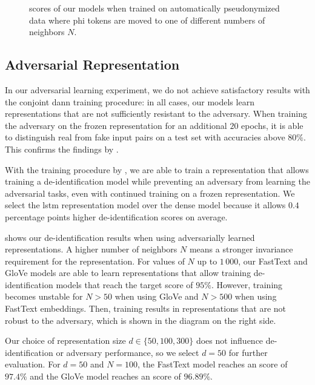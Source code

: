 \begin{figure}
    \centering
    
    \caption[De-identification with automatic pseudonymization]{\fone scores of our models when trained on automatically pseudonymized data where \ac{phi} tokens are moved to one of different numbers of neighbors $N$.}\label{fig:auto-pseudo}
\end{figure}

\subsection{Adversarial Representation}
%
In our adversarial learning experiment, we do not achieve satisfactory results with the conjoint \ac{dann} training procedure: in all cases, our models learn representations that are not sufficiently resistant to the adversary.
%
When training the adversary on the frozen representation for an additional $20$ epochs, it is able to distinguish real from fake input pairs on a test set with accuracies above $80\%$.
%
This confirms the findings by \citet{elazar2018adversarial}.

%
With the training procedure by \citet{feutry2018learning}, we are able to train a representation that allows training a de-identification model while preventing an adversary from learning the adversarial tasks, even with continued training on a frozen representation.
%
We select the \ac{lstm} representation model over the dense model because it allows $0.4$ percentage points higher de-identification \fone scores on average.

%
 shows our de-identification results when using adversarially learned representations.
%
A higher number of neighbors $N$ means a stronger invariance requirement for the representation.
%
For values of $N$ up to $1\,000$, our FastText and GloVe models are able to learn representations that allow training de-identification models that reach the target \fone score of $95\%$.
%
However, training becomes unstable for $N>50$ when using GloVe and $N>500$ when using FastText embeddings.
%
Then, training results in representations that are not robust to the adversary, which is shown in the diagram on the right side.

%
Our choice of representation size $d \in \{50, 100, 300\}$ does not influence de-identifi\-ca\-tion or adversary performance, so we select $d=50$ for further evaluation.
%
For $d=50$ and $N=100$, the FastText model reaches an \fone score of $97.4\%$ and the GloVe model reaches an \fone score of $96.89\%$.

